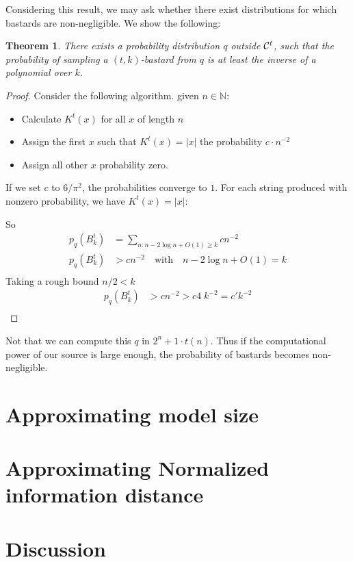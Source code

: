 \documentclass[10pt,a4paper,oneside]{article}
\newtheorem{thm}{Theorem}
\begin{document}
Considering this result, we may ask whether there exist distributions for which bastards are non-negligible. We show the following:

\begin{thm}
There exists a probability distribution $q$ outside ${\cal C}^t$, such that the probability of sampling a $(t, k)$-bastard from $q$ is at least the inverse of a polynomial over $k$.
\end{thm}
\begin{proof}
Consider the following algorithm.
given $n \in {\mathbb N}$:
\begin{itemize}
  \item Calculate $K^t(x)$ for all $x$ of length $n$ 
  \item Assign the first $x$ such that $K^t(x) = |x|$ the probability $c \cdot n^{-2}$
  \item Assign all other $x$ probability zero.
\end{itemize}
If we set $c$ to $6 / \pi^2$, the probabilities converge to $1$. For each string produced with nonzero probability, we have $K^t(x) = |x|$:

So
\begin{align*}
p_q(B^t_k) &= \sum_{n : n - 2\log n + O(1) \geq k} cn^{-2}\\
p_q(B^t_k) &> cn^{-2} \quad\text{with}\quad n -2\log n + O(1) = k\\
\end{align*}
Taking a rough bound $n/2 < k$
\begin{align*}
p_q(B^t_k) &> cn^{-2} > c4 \;k^{-2} = c' k^{-2}\\
\end{align*}
\end{proof}

Not that we can compute this $q$ in $2^n+1\cdot t(n)$. Thus if the computational power of our source is large enough, the probability of bastards becomes non-negligible.

\section*{Approximating model size}

\section*{Approximating Normalized information distance}

\section*{Discussion}

\nocite{*}


\end{document}
